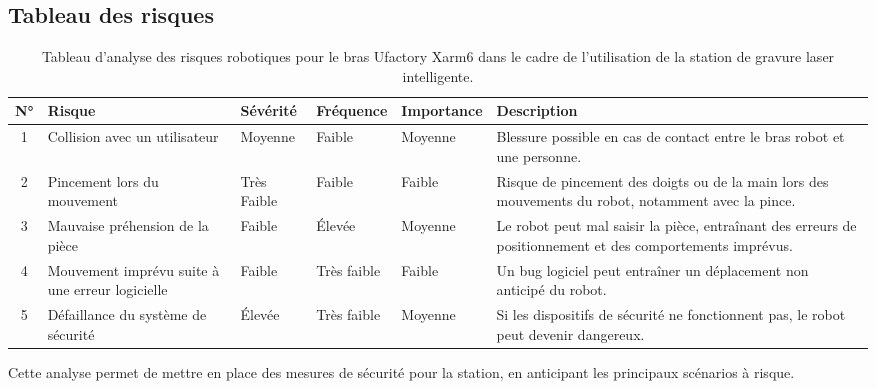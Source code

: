 \subsection{Tableau des risques}

\begin{table}[H]
    \centering
    \renewcommand{\arraystretch}{1.4}
    \begin{tabular}{|c|p{3.5cm}|>{\centering\arraybackslash}m{2.2cm}|>{\centering\arraybackslash}m{2.2cm}|>{\centering\arraybackslash}m{2.2cm}|p{3.5cm}|}
        \hline
        \textbf{N°} & \textbf{Risque} & \textbf{Sévérité} & \textbf{Fréquence} & \textbf{Importance} & \textbf{Description} \\
        \hline
        1 & Collision avec un utilisateur & \cellcolor{orange!60}Moyenne & \cellcolor{yellow!60}Faible & \cellcolor{orange!60}Moyenne & Blessure possible en cas de contact entre le bras robot et une personne. \\
        \hline
        2 & Pincement lors du mouvement & \cellcolor{green!60}Très Faible & \cellcolor{yellow!60}Faible & \cellcolor{yellow!60}Faible & Risque de pincement des doigts ou de la main lors des mouvements du robot, notamment avec la pince. \\
        \hline
        3 & Mauvaise préhension de la pièce & \cellcolor{yellow!60}Faible & \cellcolor{red!60}Élevée & \cellcolor{orange!60}Moyenne & Le robot peut mal saisir la pièce, entraînant des erreurs de positionnement et des comportements imprévus. \\
        \hline
        4 & Mouvement imprévu suite à une erreur logicielle & \cellcolor{yellow!60}Faible & \cellcolor{green!60}Très faible & \cellcolor{yellow!60}Faible & Un bug logiciel peut entraîner un déplacement non anticipé du robot. \\
        \hline
        5 & Défaillance du système de sécurité & \cellcolor{red!60}Élevée & \cellcolor{green!60}Très faible & \cellcolor{orange!60}Moyenne & Si les dispositifs de sécurité ne fonctionnent pas, le robot peut devenir dangereux. \\
        \hline
    \end{tabular}
    \caption{Tableau d'analyse des risques robotiques pour le bras Ufactory Xarm6 dans le cadre de l'utilisation de la station de gravure laser intelligente.}
    \label{tab:risques_robotique}
\end{table}

Cette analyse permet de mettre en place des mesures de sécurité pour la station, en anticipant les principaux scénarios à risque.

